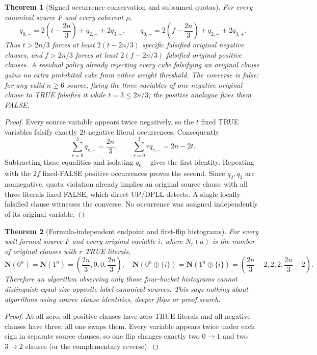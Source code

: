 \documentclass[11pt]{article}
\newtheorem{theorem}{Theorem}
\begin{document}
\begin{theorem}[Signed occurrence conservation and subsumed quotas]
For every canonical source $F$ and every coherent $\rho$,
\[
\boxed{q_{0,-}=2\left(t-\frac{2n}{3}\right)+q_{2,-}+2q_{3,-},}
\qquad
\boxed{q_{0,+}=2\left(f-\frac{2n}{3}\right)+q_{2,+}+2q_{3,+}.}
\]
Thus $t>2n/3$ forces at least $2(t-2n/3)$ \emph{specific}
falsified original negative clauses, and $f>2n/3$ forces
at least $2(f-2n/3)$ falsified original positive clauses.
A residual policy already rejecting every cube falsifying an original
clause gains no extra prohibited cube from either weight threshold.
The converse is false: for any valid $n\ge6$ source, fixing
the three variables of one negative original clause to TRUE falsifies
it while $t=3\le2n/3$; the positive analogue fixes them FALSE.
\end{theorem}
\begin{proof}
Every source variable appears twice negatively, so the $t$ fixed TRUE
variables falsify exactly $2t$ negative literal occurrences.
Consequently
\[
\sum_{r=0}^3q_{r,-}=\frac{2n}{3},
\qquad \sum_{r=0}^3r q_{r,-}=2n-2t.
\]
Subtracting these equalities and isolating $q_{0,-}$ gives
the first identity. Repeating with the $2f$ fixed-FALSE
positive occurrences proves the second. Since $q_2,q_3$
are nonnegative, quota violation already implies an
original source clause with all three literals fixed FALSE,
which direct UP/DPLL detects. A single locally falsified
clause witnesses the converse. No occurrence was assigned
independently of its original variable.
\end{proof}

\begin{theorem}[Formula-independent endpoint and first-flip histograms]
For every well-formed source $F$ and every original variable $i$,
where $N_r(a)$ is the number of original clauses with $r$ TRUE literals,
\[
\mathbf N(0^n)=\mathbf N(1^n)
=\left(\frac{2n}{3},0,0,\frac{2n}{3}\right),
\quad
\mathbf N(0^n\oplus\{i\})=\mathbf N(1^n\oplus\{i\})
=\left(\frac{2n}{3}-2,2,2,\frac{2n}{3}-2\right).
\]
Therefore an algorithm observing only those four-bucket
histograms cannot distinguish equal-size opposite-label
canonical sources. This says nothing about algorithms using
source clause identities, deeper flips or proof search.
\end{theorem}
\begin{proof}
At all zero, all positive clauses have zero TRUE literals and all
negative clauses have three; all one swaps them. Every variable
appears twice under each sign in separate source clauses, so
one flip changes exactly two $0\to1$ and two $3\to2$
clauses (or the complementary reverse).
\end{proof}
\end{document}
